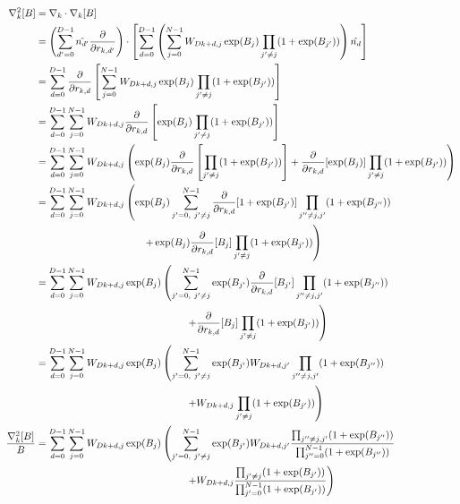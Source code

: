 \documentclass[12pt]{article}
\begin{document}
\begin{align*}
\nabla_k^2[B] &= \nabla_k \cdot \nabla_k [B] \\
&= \left( \sum_{d'=0}^{D-1} \hat{n_{d'}} \frac{\partial}{\partial r_{k,d'}} \right) \cdot \left[  \sum_{d=0}^{D-1} \left( \sum_{j=0}^{N-1} W_{Dk+d,j} \exp(B_j)  \prod_{j'\neq j} (1+\exp(B_{j'})) \right) \hat{n_d}\right] \\
&= \sum_{d=0}^{D-1} \frac{\partial}{\partial r_{k,d}} \left[ \sum_{j=0}^{N-1} W_{Dk+d,j} \exp(B_j)  \prod_{j'\neq j} (1+\exp(B_{j'})) \right]  \\
&= \sum_{d=0}^{D-1}\sum_{j=0}^{N-1}  W_{Dk+d,j} \frac{\partial}{\partial r_{k,d}} \left[  \exp(B_j)  \prod_{j'\neq j} (1+\exp(B_{j'})) \right]\\
&= \sum_{d=0}^{D-1}\sum_{j=0}^{N-1}  W_{Dk+d,j} \left(  \exp(B_j) \frac{\partial}{\partial r_{k,d}} \left[  \prod_{j'\neq j} (1+\exp(B_{j'})) \right] + \frac{\partial}{\partial r_{k,d}} [\exp(B_j)]  \prod_{j'\neq j} (1+\exp(B_{j'})) \right)\\
&= \sum_{d=0}^{D-1}\sum_{j=0}^{N-1}  W_{Dk+d,j} \left( \exp(B_j) \sum_{j'=0,\ j'\neq j}^{N-1} \frac{\partial}{\partial r_{k,d}} [1+\exp(B_{j'})] \prod_{j''\neq j,j'} (1+\exp(B_{j''})) \right.\\
& \hspace*{3.75cm} \left. + \exp(B_j) \frac{\partial}{\partial r_{k,d}} [B_j] \prod_{j'\neq j} (1+\exp(B_{j'})) \right)\\
&= \sum_{d=0}^{D-1}\sum_{j=0}^{N-1}  W_{Dk+d,j} \exp(B_j) \left(  \sum_{j'=0,\ j'\neq j}^{N-1} \exp(B_{j'}) \frac{\partial}{\partial r_{k,d}} [B_{j'}] \prod_{j''\neq j,j'} (1+\exp(B_{j''})) \right.\\
& \hspace*{5.25cm} \left. + \frac{\partial}{\partial r_{k,d}} [B_j] \prod_{j'\neq j} (1+\exp(B_{j'})) \right)\\
&= \sum_{d=0}^{D-1}\sum_{j=0}^{N-1}  W_{Dk+d,j} \exp(B_j) \left(  \sum_{j'=0,\ j'\neq j}^{N-1} \exp(B_{j'}) W_{Dk+d,j'} \prod_{j''\neq j,j'} (1+\exp(B_{j''})) \right.\\
& \hspace*{5.25cm} \left. + W_{Dk+d,j} \prod_{j'\neq j} (1+\exp(B_{j'})) \right)\\
\frac{\nabla_k^2[B]}{B} &= \sum_{d=0}^{D-1}\sum_{j=0}^{N-1}  W_{Dk+d,j} \exp(B_j) \left(  \sum_{j'=0,\ j'\neq j}^{N-1} \exp(B_{j'}) W_{Dk+d,j'} \frac{\prod_{j''\neq j,j'} (1+\exp(B_{j''}))}{\prod_{j''=0}^{N-1}(1+\exp(B_{j''}))} \right.\\
& \hspace*{5.25cm} \left. + W_{Dk+d,j} \frac{\prod_{j'\neq j} (1+\exp(B_{j'}))}{\prod_{j'=0}^{N-1}(1+\exp(B_{j'}))} \right)\\

\end{align*}
\end{document}
